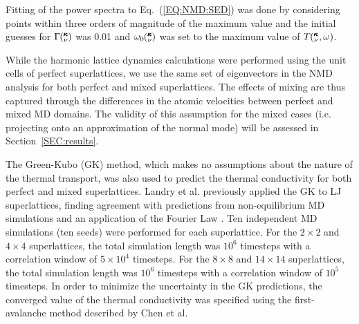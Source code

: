 \begin{comment}
In accordance with anharmonic theory,\cite{maradudin_scattering_1962} the power spectrum can be approximated to be a Lorentzian function, centered at $\omega_0\kv$, which is shifted from the $\omega\kv$,  with a full width at half maximum $\Gamma\kv$ of the form 
\begin{equation}\label{EQ:NMD:LOR}
T\kvw \approx C_0\kv\frac{\Gamma\kv/\pi}{[\omega_0\kv-\omega]^2+\Gamma^2\kv},
\end{equation}
when $\Gamma\kv \ll \omega\kv$. Fitting Eq.~(\ref{EQ:NMD:LOR}) to Eq.~(\ref{EQ:NMD:SED}) yields the phonon lifetime from\cite {PhysRevB.81.081411}
\begin{equation}\label{EQ:lifetime}
\tau\kv=\frac{1}{2\Gamma\kv}.
\end{equation}
\end{comment}
Fitting of the power spectra to Eq.~(\ref{EQ:NMD:SED}) was done by considering points within three orders of magnitude of the maximum value and the initial guesses for $\Gamma\mspace{-4.0mu}\left(\mspace{-8.0mu} \begin{smallmatrix}&\pmb{\kappa} \\&\nu\end{smallmatrix} \mspace{-3.0mu}\right)$ was 0.01 and $\omega_0\mspace{-4.0mu}\left(\mspace{-8.0mu} \begin{smallmatrix}&\pmb{\kappa} \\&\nu\end{smallmatrix} \mspace{-3.0mu}\right)$ was set to the maximum value of $T\mspace{-4.0mu}\left(\mspace{-8.0mu} \begin{smallmatrix}&\pmb{\kappa} \\&\nu\end{smallmatrix} \mspace{-2.0mu},\omega\right)$. 

While the harmonic lattice dynamics calculations were performed using the unit cells of perfect superlattices, we use the same set of eigenvectors in the NMD analysis for both perfect and mixed superlattices. The effects of mixing are thus captured through the differences in the atomic velocities between perfect and mixed MD domains. The validity of this assumption for the mixed cases (i.e. projecting onto an approximation of the normal mode) will be assessed in Section~\ref{SEC:results}.

The Green-Kubo (GK) method, which makes no assumptions about the nature of the thermal transport, was also used to predict the thermal conductivity for both perfect and mixed superlattices. Landry et al. previously applied the GK to LJ superlattices, finding agreement with predictions from non-equilibrium MD simulations and an application of the Fourier Law \cite{PhysRevB.79.075316}.
Ten independent MD simulations  (ten seeds) were performed for each superlattice. For the $2 \times 2$ and $4 \times 4$ superlattices, the total  simulation length was $10^6$ timesteps with a correlation window of $5\times 10^4$ timesteps.  For the $8 \times 8$ and $14 \times 14$ superlattices, the total  simulation length was $10^6$ timesteps with a correlation window of $10^5$ timesteps. In order to minimize the uncertainty in the GK predictions, the converged value of the thermal conductivity was specified using the first-avalanche method described by Chen et al. \cite{Chen20102392}

